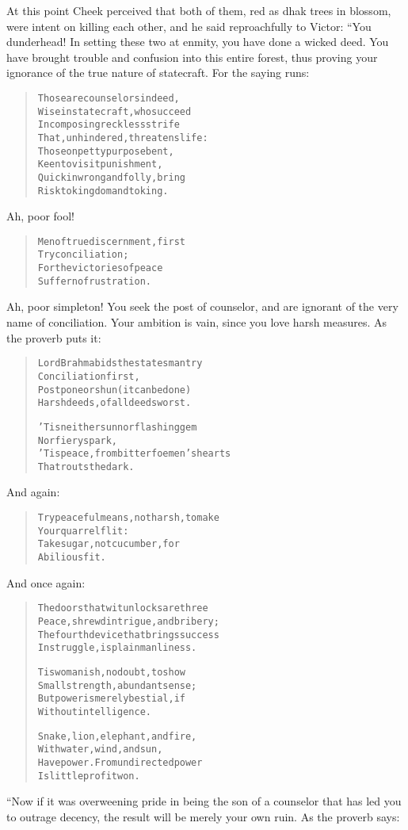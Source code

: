 \documentclass[article, twoside, 14pt]{memoir}
\renewenvironment{verbatim}{%
\begin{quote}%
\vskip -10pt%
\begin{alltt}\normalfont\large}{\end{alltt}%
\end{quote}%
\vskip -10pt
} %
\begin{document}
At this point Cheek perceived that both of them, red as dhak trees
in blossom, were intent on killing each other, and he said
reproachfully to Victor: “You dunderhead! In setting these two at
enmity, you have done a wicked deed. You have brought trouble and
confusion into this entire forest, thus proving your ignorance of
the true nature of statecraft. For the saying runs:

\begin{verbatim}
Those are counselors indeed,
Wise in statecraft, who succeed
In composing reckless strife
That, unhindered, threatens life:
Those on petty purpose bent,
Keen to visit punishment,
Quick in wrong and folly, bring
Risk to kingdom and to king.
\end{verbatim}
Ah, poor fool!

\begin{verbatim}
Men of true discernment, first
    Try conciliation;
For the victories of peace
    Suffer no frustration.
\end{verbatim}
Ah, poor simpleton! You seek the post of counselor, and are
ignorant of the very name of conciliation. Your ambition is vain,
since you love harsh measures. As the proverb puts it:

\begin{verbatim}
Lord Brahma bids the statesman try
    Conciliation first,
Postpone or shun (it can be done)
    Harsh deeds, of all deeds worst.

'Tis neither sun nor flashing gem
    Nor fiery spark,
'Tis peace, from bitter foemen's hearts
    That routs the dark.
\end{verbatim}
And again:

\begin{verbatim}
Try peaceful means, not harsh, to make
    Your quarrel flit:
Take sugar, not cucumber, for
    A bilious fit.
\end{verbatim}
And once again:

\begin{verbatim}
The doors that wit unlocks are three{\textemdash}
Peace, shrewd intrigue, and bribery;
The fourth device that brings success
In struggle, is plain manliness.

Tis womanish, no doubt, to show
    Small strength, abundant sense;
But power is merely bestial, if
    Without intelligence.

Snake, lion, elephant, and fire,
    With water, wind, and sun,
Have power. From undirected power
    Is little profit won.
\end{verbatim}
“Now if it was overweening pride in being the son of a counselor
that has led you to outrage decency, the result will be merely your
own ruin. As the proverb says:
\end{document}
